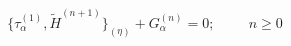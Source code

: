 \begin{equation}
   \{\tau_\alpha^{(1)}, \tilde{H}^{(n+1)}\}_{(\eta)}+G_\alpha^{(n)}=0;\hspace {1cm}
   n\geq0
   \label{a18}
   \end{equation}

